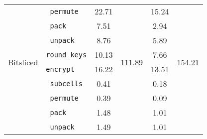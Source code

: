 \begin{table}[h!]
\begin{tabular}{llcccc}
                                              & \texttt{ permute} & 22.71 & & 15.24 & \\
                                              & \texttt{ pack} & 7.51 & & 2.94 & \\
                                              & \texttt{ unpack} & 8.76 & & 5.89 & \\
        \midrule
        \multirow{2}{*}{Bitsliced} & \texttt{round\_keys} & 10.13 & \multirow{2}{*}{111.89} & 7.66 & \multirow{2}{*}{154.21} \\
                                   & \texttt{encrypt} & 16.22 & & 13.51 & \\
        \cmidrule(lr){2-2}
                                   & \texttt{ subcells} & 0.41 & & 0.18 & \\
                                   & \texttt{ permute} & 0.39 & & 0.09 & \\
                                   & \texttt{ pack} & 1.48 & & 1.01 & \\
                                   & \texttt{ unpack} & 1.49 & & 1.01 & \\
        \bottomrule
    \end{tabular}
\end{table}
